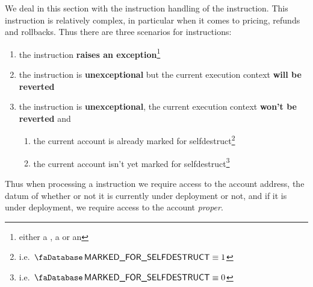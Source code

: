 We deal in this section with the instruction handling of the  instruction. 
This instruction is relatively complex, in particular when it comes to pricing, refunds and rollbacks.
Thus there are three scenarios for  instructions:
\begin{enumerate}
	\item the instruction \textbf{raises an exception}\footnote{either a \suxSH{}, a \staticxSH{} or an \oogxSH{}}
        \item the instruction is \textbf{unexceptional} but the current execution context \textbf{will be reverted}
        \item the instruction is \textbf{unexceptional}, the current execution context \textbf{won't be reverted} and
		\begin{enumerate}
			\item  the current account is already marked for selfdestruct\footnote{i.e. $\accMarkedForSelfdestruct \equiv 1$}
			\item  the current account isn't yet  marked for selfdestruct\footnote{i.e. $\accMarkedForSelfdestruct \equiv 0$}
		\end{enumerate}
\end{enumerate}
Thus when processing a  instruction we require access to the account address, the datum of whether or not it is currently under deployment or not, and if it is under deployment, we require access to the account \emph{proper}.
